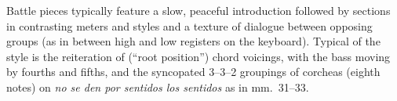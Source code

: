 \documentclass{article}
\begin{document}
Battle pieces typically feature a slow, peaceful introduction followed by
sections in contrasting meters and styles and a texture of dialogue between
opposing groups (as in between high and low registers on the keyboard).
Typical of the style is the reiteration of 
(``root position'') chord voicings, with the bass moving by fourths and
fifths, and the syncopated 3--3--2 groupings of corcheas (eighth notes) on
\emph{no se den por sentidos los sentidos} as in mm.~31--33.
\end{document}

